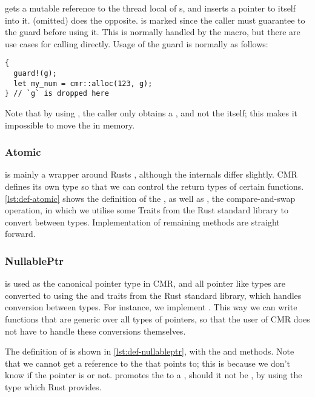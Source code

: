  gets a mutable reference to the thread local  of s,
and inserts a pointer to itself into it.  (omitted) does the opposite.
 is marked  since the caller must guarantee to  the
guard before using it. This is normally handled by the  macro, but there are use cases
for calling  directly. Usage of the guard is normally as follows:
\begin{lstlisting}[style=Rust]
{
  guard!(g);
  let my_num = cmr::alloc(123, g);
} // `g` is dropped here
\end{lstlisting}
Note that by using , the caller only obtains a , and not the
 itself; this makes it impossible to move the  in memory.


\subsubsection{Atomic}

 is mainly a wrapper around Rusts , although the internals differ
slightly. CMR defines its own type so that we can control the return types of certain functions.
\cref{lst:def-atomic} shows the definition of the , as well as , the
compare-and-swap operation, in which we utilise some Traits from the Rust standard library to
convert between types.  Implementation of remaining methods are straight forward.



\pagebreak
\subsubsection{NullablePtr}

 is used as the canonical pointer type in CMR, and all pointer like types are
converted to  using the  and  traits from the Rust standard
library, which handles conversion between types. For instance, we implement . This way we can write functions that are generic over all types of pointers, so
that the user of CMR does not have to handle these conversions themselves.


The definition of  is shown in \cref{lst:def-nullableptr}, with the 
and  methods. Note that we cannot get a reference to the  that 
points to; this is because we don't know if the pointer is  or not.  promotes
the  to a , should it not be , by using the 
type which Rust provides.

